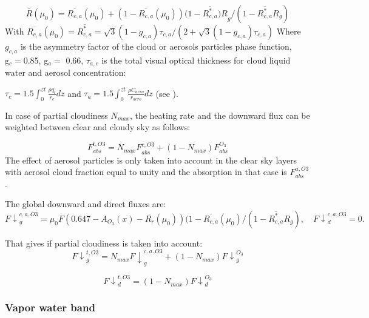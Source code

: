 \begin{equation}
\bar{R}\left( \mu_{0} \right)=\overline{R_{c,a}}\left( \mu_{0}
\right)+(1-\overline{R_{c,a}}\left( \mu_{0} \right))(1-\overline{R_{c,a}^{\ast
}}{)R}_{g}/(1-\overline{R_{c,a}^{\ast }}R_{g})
\end{equation}
With $\overline{R_{c,a}}\left( \mu_{0} \right)=\overline{R_{c,a}^{\ast }}=\sqrt 3
\left( 1-g_{c,a} \right)\tau_{c,a}/(2+\sqrt 3 \left( 1-g_{c,a} \right)\tau
_{c,a})$
Where $g_{c,a}$ is the asymmetry factor of the cloud or aerosols
particles phase function, \\
g$_{c}=$0.85, g$_{a}=$ 0.66, $\tau_{a,c}$ is the total visual optical thickness
for cloud liquid water and aerosol concentration:

$\tau_{c}=1.5\int_0^{zt} \frac{\rho q_{l}}{r_{e}} dz$ and $\tau
_{a}=1.5\int_0^{zt} \frac{\rho C_{aero}}{r_{aero}} dz$ (see \cite{Stephens:1984}).

In case of partial cloudiness $N_{max}$, the heating rate and the downward
flux can be weighted between clear and cloudy sky as follows:

\begin{equation}
F_{abs}^{t,O3}={N_{max}F}_{abs}^{c,O3}+(1-N_{max})F_{abs}^{O_{3}}
\end{equation}
The effect of aerosol particles is only taken into account in the clear sky
layers with aerosol cloud fraction equal to unity and the absorption in that
case is $F_{abs}^{a,O3}$.

The global downward and direct fluxes are:
\begin{equation}
{F\downarrow }_{g}^{c,a,O3}=\mu_{0}F(0.647-A_{O_{3}}\left( x
\right)-\overline{R_{r}}\left( \mu_{0} \right))(1-\overline{R_{c,a}}\left( \mu_{0}
\right)/(1-\overline{R_{c,a}^{\ast }}R_{g}),\quad
{F\downarrow }_{d}^{c,a,O3}=0.
\end{equation}

That gives if partial cloudiness is taken into account:
\begin{equation}
{F\downarrow }_{g}^{t,O3}={N_{max}F\downarrow
}_{g}^{c,a,O3}+(1-N_{max}){F\downarrow }_{g}^{O_{3}}
\end{equation}

\begin{equation}
{F\downarrow }_{d}^{t,O3}=(1-N_{max}){F\downarrow }_{d}^{O_{3}}
\end{equation}
\subsubsection{Vapor water band}

